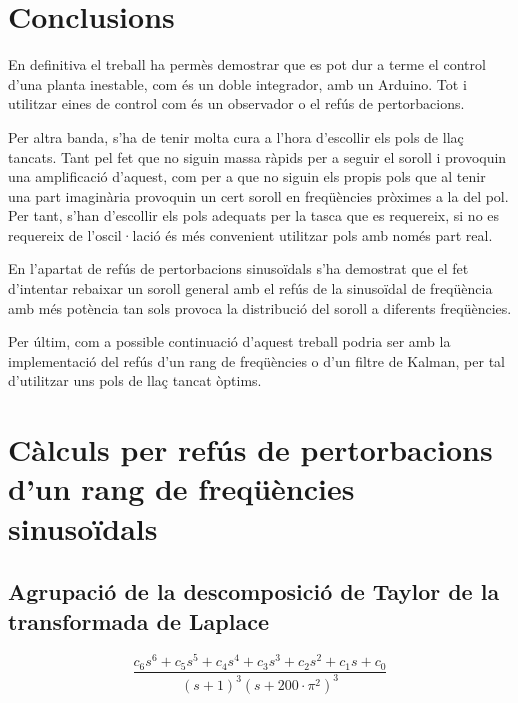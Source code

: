 \documentclass[12pt,a4paper,final,twoside,openright]{report}
\begin{document}
\chapter{Conclusions}
En definitiva el treball ha permès demostrar que es pot dur a terme el control d'una planta inestable, com és un doble integrador, amb un Arduino. Tot i utilitzar eines de control com és un observador o el refús de pertorbacions.

Per altra banda, s'ha de tenir molta cura a l'hora d'escollir els pols de llaç tancats. Tant pel fet que no siguin massa ràpids per a seguir el soroll i provoquin una amplificació d'aquest, com per a que no siguin els propis pols que al tenir una part imaginària provoquin un cert soroll en freqüències pròximes a la del pol. Per tant, s'han d'escollir els pols adequats per la tasca que es requereix, si no es requereix de l'oscil·lació és més convenient utilitzar pols amb només part real.

En l'apartat de refús de pertorbacions sinusoïdals s'ha demostrat que el fet d'intentar rebaixar un soroll general amb el refús de la sinusoïdal de freqüència amb més potència tan sols provoca la distribució del soroll a diferents freqüències.

Per últim, com a possible continuació d'aquest treball podria ser amb la implementació del refús d'un rang de freqüències o d'un filtre de Kalman, per tal d'utilitzar uns pols de llaç tancat òptims. 

\appendix
\clearpage %
\addappheadtotoc
\appendixpage

\chapter{Càlculs per refús de pertorbacions d'un rang de freqüències sinusoïdals}
\section{Agrupació de la descomposició de Taylor de la transformada de Laplace}
\label{ann:pert_rang_agrup}
\begin{equation*}
\frac{c_6 s^6 + c_5 s^5 + c_4 s^4 + c_3 s^3 + c_2 s^2 + c_1 s + c_0}{(s+1)^3 (s+200\cdot \pi^2)^3}
\end{equation*}
\end{document}
